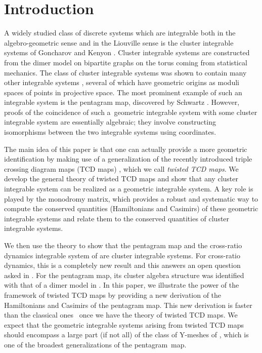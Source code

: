 \documentclass[pdftex]{sigma}
\numberwithin{equation}{section}
\begin{document}


	
\section{Introduction}
	
A widely studied class of discrete systems which are integrable both in the algebro-geometric sense and in the Liouville sense is the cluster integrable systems of Goncharov and Kenyon \cite{GK13}. Cluster integrable systems are constructed from the dimer model on bipartite graphs on the torus coming from statistical mechanics. The class of cluster integrable systems was shown to contain many other integrable systems \cite{FM16}, several of which have geometric origins as moduli spaces of points in projective space. The most prominent example of such an integrable system is the pentagram map, discovered by Schwartz \cite{Schwartz1}. However, proofs of the coincidence of such a~geometric integrable system with some cluster integrable system are essentially algebraic; they involve constructing isomorphisms between the two integrable systems using coordinates.
	
	The main idea of this paper is that one can actually provide a more geometric identification by making use of a generalization of the recently introduced triple crossing diagram maps (TCD maps) \cite{AGPR,AGR}, which we call \textit{twisted TCD maps}. We develop the general theory of twisted TCD maps and show that any cluster integrable system can be realized as a geometric integrable system. A key role is played by the monodromy matrix, which provides a robust and systematic way to compute the conserved quantities (Hamiltonians and Casimirs) of these geometric integrable systems and relate them to the conserved quantities of cluster integrable systems.
	
	We then use the theory to show that the pentagram map and the cross-ratio dynamics integrable system of \cite{AFIT} are cluster integrable systems. For cross-ratio dynamics, this is a completely new result and this answers an open question asked in \cite{AFIT}. For the pentagram map, its cluster algebra structure was identified with that of a dimer model in \cite{AGPR}. In this paper, we illustrate the power of the framework of twisted TCD maps by providing a new derivation of the Hamiltonians and Casimirs of the pentagram map. This new derivation is faster than the classical ones~\mbox{\cite{OST1,Soloviev}} once we have the theory of twisted TCD maps. We expect that the geometric integrable systems arising from twisted TCD maps should encompass a large part (if not all) of the class of Y-meshes of \cite{GP}, which is one of the broadest generalizations of the pentagram~map.
	
\end{document}
